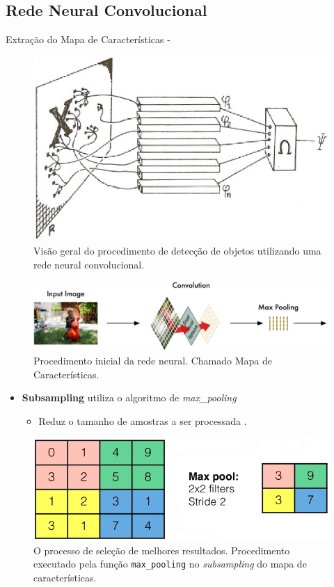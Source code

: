 \documentclass[aspectratio=169, xcolor=dvipsnames]{beamer}
\let\olditem=\item%
\renewcommand{\item}{\olditem \justifying}
\begin{document}
	\subsection{Rede Neural Convolucional}
		\begin{frame}[allowframebreaks]{Extração do Mapa de Características -}

			\begin{figure}[h]
				\centering
				\includegraphics[width=0.56\linewidth]{img/single_layer_cnn.png}
				\caption{Visão geral do procedimento de detecção de objetos utilizando uma rede neural convolucional.}
				\label{fig:single_cnn.png}
			\end{figure}
		
			\begin{figure}[h]
				\centering
				\includegraphics[width=1.0\linewidth]{img/features_map.png}
				\caption{Procedimento inicial da rede neural. Chamado Mapa de Características.}
				\label{fig:colored_cnn.png}
			\end{figure}
		
			\begin{itemize}
				\item \textbf{Subsampling} utiliza o algoritmo de \textit{max\_pooling}
				\begin{itemize}
					\item  Reduz o tamanho de amostras a ser processada \cite{Giusti2013}.
				\end{itemize}
			\end{itemize}
	
			\begin{figure}[H]
				\centering
				\includegraphics[width=0.7\linewidth]{img/max_pooling-2.png}
				\caption{O processo de seleção de melhores resultados. Procedimento executado pela função \texttt{max\_pooling} no \textit{subsampling} do mapa de características.}
				\label{fig:max_pooling.png}
			\end{figure}
		
		\end{frame}
\end{document}
